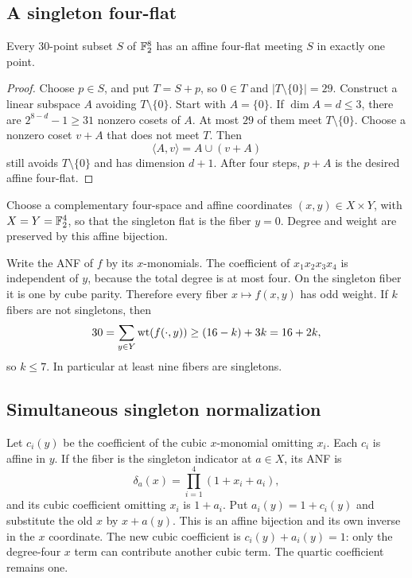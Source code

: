 \subsection{A singleton four-flat}
\begin{lemma}\label{lem:singleton}
Every $30$-point subset $S$ of $\mathbb F_2^8$ has an affine four-flat meeting $S$ in exactly one point.
\end{lemma}
\begin{proof}
Choose $p\in S$, and put $T=S+p$, so $0\in T$ and $|T\setminus\{0\}|=29$. Construct a linear subspace $A$ avoiding $T\setminus\{0\}$. Start with $A=\{0\}$. If $\dim A=d\le3$, there are $2^{8-d}-1\ge31$ nonzero cosets of $A$. At most $29$ of them meet $T\setminus\{0\}$. Choose a nonzero coset $v+A$ that does not meet $T$. Then
\[
\langle A,v\rangle=A\cup(v+A)
\]
still avoids $T\setminus\{0\}$ and has dimension $d+1$. After four steps, $p+A$ is the desired affine four-flat.
\end{proof}

Choose a complementary four-space and affine coordinates $(x,y)\in X\times Y$, with $X=Y=\mathbb F_2^4$, so that the singleton flat is the fiber $y=0$. Degree and weight are preserved by this affine bijection.

Write the ANF of $f$ by its $x$-monomials. The coefficient of $x_1x_2x_3x_4$ is independent of $y$, because the total degree is at most four. On the singleton fiber it is one by cube parity. Therefore every fiber $x\mapsto f(x,y)$ has odd weight. If $k$ fibers are not singletons, then
\[
30=\sum_{y\in Y}\operatorname{wt}(f(\cdot,y))\ge(16-k)+3k=16+2k,
\]
so $k\le7$. In particular at least nine fibers are singletons.

\subsection{Simultaneous singleton normalization}
Let $c_i(y)$ be the coefficient of the cubic $x$-monomial omitting $x_i$. Each $c_i$ is affine in $y$. If the fiber is the singleton indicator at $a\in X$, its ANF is
\[
\delta_a(x)=\prod_{i=1}^4(1+x_i+a_i),
\]
and its cubic coefficient omitting $x_i$ is $1+a_i$. Put $a_i(y)=1+c_i(y)$ and substitute the old $x$ by $x+a(y)$. This is an affine bijection and its own inverse in the $x$ coordinate. The new cubic coefficient is $c_i(y)+a_i(y)=1$: only the degree-four $x$ term can contribute another cubic term. The quartic coefficient remains one.

